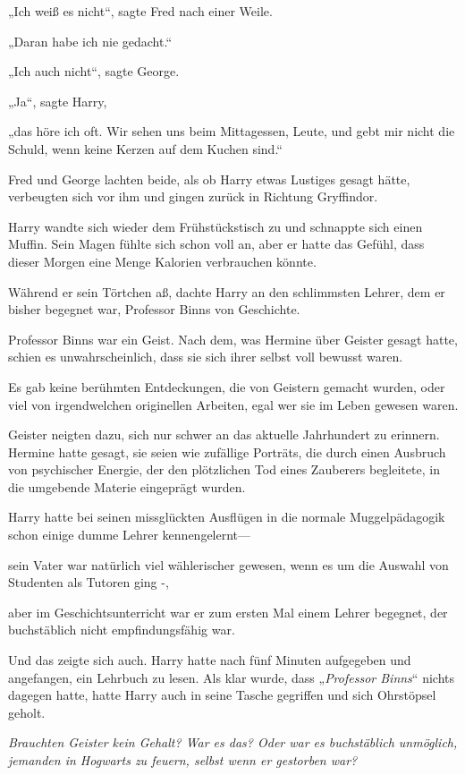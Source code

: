 {„Ich weiß es nicht“, sagte Fred nach einer Weile.

„Daran habe ich nie gedacht.“

„Ich auch nicht“, sagte George.

„Ja“, sagte Harry,

„das höre ich oft. Wir sehen uns beim Mittagessen, Leute, und gebt mir nicht die Schuld, wenn keine Kerzen auf dem Kuchen sind.“

Fred und George lachten beide, als ob Harry etwas Lustiges gesagt hätte, verbeugten sich vor ihm und gingen zurück in Richtung Gryffindor.

Harry wandte sich wieder dem Frühstückstisch zu und schnappte sich einen Muffin. Sein Magen fühlte sich schon voll an, aber er hatte das Gefühl, dass dieser Morgen eine Menge Kalorien verbrauchen könnte.

Während er sein Törtchen aß, dachte Harry an den schlimmsten Lehrer, dem er bisher begegnet war, Professor Binns von Geschichte.

Professor Binns war ein Geist. Nach dem, was Hermine über Geister gesagt hatte, schien es unwahrscheinlich, dass sie sich ihrer selbst voll bewusst waren.

Es gab keine berühmten Entdeckungen, die von Geistern gemacht wurden, oder viel von irgendwelchen originellen Arbeiten, egal wer sie im Leben gewesen waren.

Geister neigten dazu, sich nur schwer an das aktuelle Jahrhundert zu erinnern. Hermine hatte gesagt, sie seien wie zufällige Porträts, die durch einen Ausbruch von psychischer Energie, der den plötzlichen Tod eines Zauberers begleitete, in die umgebende Materie eingeprägt wurden.

Harry hatte bei seinen missglückten Ausflügen in die normale Muggelpädagogik schon einige dumme Lehrer kennengelernt—

sein Vater war natürlich viel wählerischer gewesen, wenn es um die Auswahl von Studenten als Tutoren ging -,

aber im Geschichtsunterricht war er zum ersten Mal einem Lehrer begegnet, der buchstäblich nicht empfindungsfähig war.

Und das zeigte sich auch. Harry hatte nach fünf Minuten aufgegeben und angefangen, ein Lehrbuch zu lesen. Als klar wurde, dass „\emph{Professor Binns}“ nichts dagegen hatte, hatte Harry auch in seine Tasche gegriffen und sich Ohrstöpsel geholt.

\emph{Brauchten Geister kein Gehalt? War es das? Oder war es buchstäblich unmöglich, jemanden in Hogwarts zu feuern, selbst wenn er gestorben war?}

}
